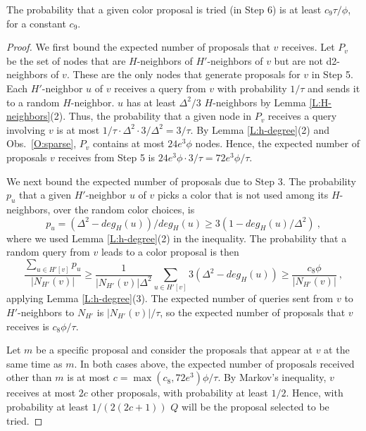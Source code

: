\begin{lemma}
  The probability that a given color proposal is tried (in Step 6) is at least $c_9 \tau/\phi$, for a constant $c_9$.
\label{L:proposal-tried}
\end{lemma}
\begin{proof}
We first bound the expected number of proposals that $v$ receives.
  Let $P_v$ be the set of nodes that are $H$-neighbors of $H'$-neighbors of $v$ but are not d2-neighbors of $v$. These are the only nodes that generate proposals for $v$ in Step 5. Each $H'$-neighbor $u$ of $v$ receives a query from $v$ with probability $1/\tau$ and sends it to a random $H$-neighbor. $u$ has at least $\Delta^2/3$ $H$-neighbors by Lemma \ref{L:H-neighbors}(2). Thus, the probability that a given node in $P_v$ receives a query involving $v$ is at most $1/\tau \cdot \Delta^2 \cdot 3/\Delta^2 = 3/\tau$. By Lemma \ref{L:h-degree}(2) and Obs.~\ref{O:sparse}, $P_v$ contains at most $24 e^3 \phi$ nodes. Hence, the expected number of proposals $v$ receives from Step 5 is $24 e^3\phi \cdot 3/\tau = 72e^3 \phi/\tau$.

We next bound the expected number of proposals due to Step 3.
The probability $p_u$ that a given $H'$-neighbor $u$ of $v$ picks a color that is not used among its $H$-neighbors, over the random color choices, is 
\[p_u = (\Delta^2 - deg_{H}(u))/deg_{H}(u) \ge 3(1 - deg_H(u)/\Delta^2)\ , \] 
where we used Lemma \ref{L:h-degree}(2) in the inequality.
The probability that a random query from $v$ leads to a color proposal is then 
  \[ \frac{\sum_{u \in H'[v]} p_u}{|N_{H'}(v)|} \ge \frac{1}{|N_{H'}(v)|\Delta^2} \sum_{u \in H'[v]} 3 \left(\Delta^2 - deg_H(u)\right) \ge  \frac{c_8 \phi}{|N_{H'}(v)|}\ ,  \]  
applying Lemma \ref{L:h-degree}(3). The expected number of queries sent from $v$ to $H'$-neighbors to $N_{H'}$ is $|N_{H'}(v)|/\tau$, so the expected number of proposals that $v$ receives is $c_8\phi/\tau$.

Let $m$ be a specific proposal and consider the proposals that appear at $v$ at the same time as $m$.
In both cases above, the expected number of proposals received other than $m$ 
is at most $c = \max(c_8, 72 e^3)\phi/\tau$. By Markov's inequality, $v$ receives at most $2c$ other proposals, with probability at least $1/2$. Hence, with probability at least $1/(2(2c+1))$ $Q$ will be the proposal selected to be tried.
\end{proof}

